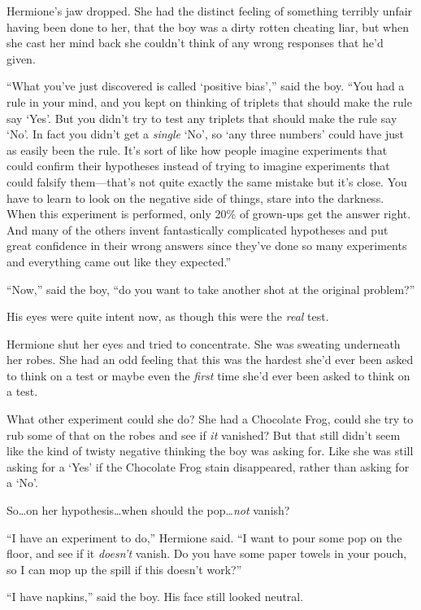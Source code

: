 Hermione’s jaw dropped. She had the distinct feeling of something terribly unfair having been done to her, that the boy was a dirty rotten cheating liar, but when she cast her mind back she couldn’t think of any wrong responses that he’d given.

“What you’ve just discovered is called ‘positive bias’,” said the boy. “You had a rule in your mind, and you kept on thinking of triplets that should make the rule say ‘Yes’. But you didn’t try to test any triplets that should make the rule say ‘No’. In fact you didn’t get a \emph{single} ‘No’, so ‘any three numbers’ could have just as easily been the rule. It’s sort of like how people imagine experiments that could confirm their hypotheses instead of trying to imagine experiments that could falsify them—that’s not quite exactly the same mistake but it’s close. You have to learn to look on the negative side of things, stare into the darkness. When this experiment is performed, only 20\% of grown-ups get the answer right. And many of the others invent fantastically complicated hypotheses and put great confidence in their wrong answers since they’ve done so many experiments and everything came out like they expected.”

“Now,” said the boy, “do you want to take another shot at the original problem?”

His eyes were quite intent now, as though this were the \emph{real} test.

Hermione shut her eyes and tried to concentrate. She was sweating underneath her robes. She had an odd feeling that this was the hardest she’d ever been asked to think on a test or maybe even the \emph{first} time she’d ever been asked to think on a test.

What other experiment could she do? She had a Chocolate Frog, could she try to rub some of that on the robes and see if \emph{it} vanished? But that still didn’t seem like the kind of twisty negative thinking the boy was asking for. Like she was still asking for a ‘Yes’ if the Chocolate Frog stain disappeared, rather than asking for a ‘No’.

So…on her hypothesis…when should the pop…\emph{not} vanish?

“I have an experiment to do,” Hermione said. “I want to pour some pop on the floor, and see if it \emph{doesn’t} vanish. Do you have some paper towels in your pouch, so I can mop up the spill if this doesn’t work?”

“I have napkins,” said the boy. His face still looked neutral.

